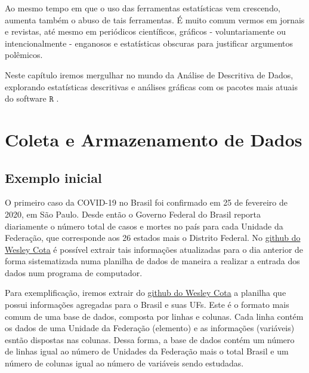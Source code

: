\documentclass[
]{book}
\begin{document}
Ao mesmo tempo em que o uso das ferramentas estatísticas vem crescendo, aumenta também o abuso de tais ferramentas. É muito comum vermos em jornais e revistas, até mesmo em periódicos científicos, gráficos - voluntariamente ou intencionalmente - enganosos e estatísticas obscuras para justificar argumentos polêmicos.

Neste capítulo iremos mergulhar no mundo da Análise de Descritiva de Dados, explorando estatísticas descritivas e análises gráficas com os pacotes mais atuais do software \(\texttt{R}\) \citep{R2020}.

\hypertarget{coleta-e-armazenamento-de-dados}{%
\section{Coleta e Armazenamento de Dados}\label{coleta-e-armazenamento-de-dados}}

\hypertarget{exemplo-inicial}{%
\subsection{Exemplo inicial}\label{exemplo-inicial}}

O primeiro caso da COVID-19 no Brasil foi confirmado em 25 de fevereiro de 2020, em São Paulo. Desde então o Governo Federal do Brasil reporta diariamente o número total de casos e mortes no país para cada Unidade da Federação, que corresponde aos 26 estados mais o Distrito Federal. No \href{https://github.com/wcota/covid19br}{github do Wesley Cota} \citep{CotaCovid19br2020} é possível extrair tais informações atualizadas para o dia anterior de forma sistematizada numa planilha de dados de maneira a realizar a entrada dos dados num programa de computador.

Para exemplificação, iremos extrair do \href{https://github.com/wcota/covid19br}{github do Wesley Cota} a planilha que possui informações agregadas para o Brasil e suas UFs. Este é o formato mais comum de uma base de dados, composta por linhas e colunas. Cada linha contém os dados de uma Unidade da Federação (elemento) e as informações (variáveis) esntão dispostas nas colunas. Dessa forma, a base de dados contém um número de linhas igual ao número de Unidades da Federação mais o total Brasil e um número de colunas igual ao número de variáveis sendo estudadas.
\end{document}
